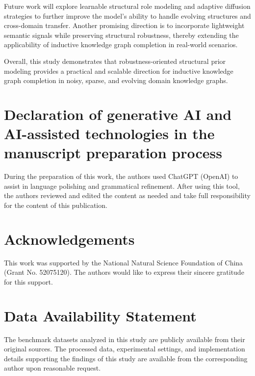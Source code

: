 \documentclass[preprint,12pt]{elsarticle}
\begin{document}
Future work will explore learnable structural role modeling and adaptive diffusion strategies to further improve the model’s ability to handle evolving structures and cross-domain transfer. Another promising direction is to incorporate lightweight semantic signals while preserving structural robustness, thereby extending the applicability of inductive knowledge graph completion in real-world scenarios.

Overall, this study demonstrates that robustness-oriented structural prior modeling provides a practical and scalable direction for inductive knowledge graph completion in noisy, sparse, and evolving domain knowledge graphs.

\section*{Declaration of generative AI and AI-assisted technologies in the manuscript preparation process}

During the preparation of this work, the authors used ChatGPT (OpenAI) to assist in language polishing and grammatical refinement. After using this tool, the authors reviewed and edited the content as needed and take full responsibility for the content of this publication.

\section*{Acknowledgements}

This work was supported by the National Natural Science Foundation of China (Grant No. 52075120). The authors would like to express their sincere gratitude for this support.

\section*{Data Availability Statement}

The benchmark datasets analyzed in this study are publicly available from their original sources. The processed data, experimental settings, and implementation details supporting the findings of this study are available from the corresponding author upon reasonable request.
\end{document}
